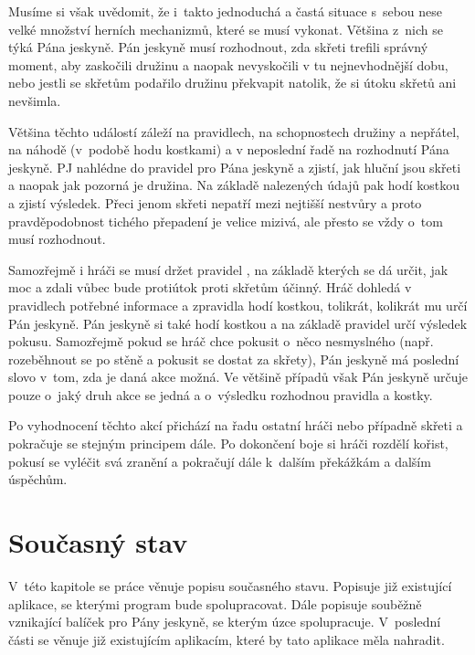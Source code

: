 \documentclass[thesis=B,czech]{resources/FITthesis}[2012/06/26]
\begin{document}
Musíme si však uvědomit, že i~takto jednoduchá a častá situace s~sebou nese velké množství herních mechanizmů, které se musí vykonat. Většina z~nich se týká Pána jeskyně. Pán jeskyně musí rozhodnout, zda skřeti trefili správný moment, aby zaskočili družinu a naopak nevyskočili v tu nejnevhodnější dobu, nebo jestli se skřetům podařilo družinu překvapit natolik, že si útoku skřetů ani nevšimla. \par

Většina těchto událostí záleží na pravidlech, na schopnostech družiny a nepřátel, na náhodě (v~podobě hodu kostkami) a v neposlední řadě na rozhodnutí Pána jeskyně. PJ nahlédne do pravidel pro Pána jeskyně\cite{draci_doupe_PJ} a zjistí, jak hluční jsou skřeti a naopak jak pozorná je družina. Na základě nalezených údajů pak hodí kostkou a zjistí výsledek. Přeci jenom skřeti nepatří mezi nejtišší nestvůry a proto pravděpodobnost tichého přepadení je velice mizivá, ale přesto se vždy o~tom musí rozhodnout. \par

Samozřejmě i hráči se musí držet pravidel \cite{draci_doupe}, na základě kterých se dá určit, jak moc a zdali vůbec bude protiútok proti skřetům účinný. Hráč dohledá v pravidlech potřebné informace a zpravidla hodí kostkou, tolikrát, kolikrát mu určí Pán jeskyně. Pán jeskyně si také hodí kostkou a na základě pravidel určí výsledek pokusu. Samozřejmě pokud se hráč chce pokusit o~něco nesmyslného (např. rozeběhnout se po stěně a pokusit se dostat za skřety), Pán jeskyně má poslední slovo v~tom, zda je daná akce možná. Ve většině případů však Pán jeskyně určuje pouze o~jaký druh akce se jedná a o~výsledku rozhodnou pravidla a kostky. \par

Po vyhodnocení těchto akcí přichází na řadu ostatní hráči nebo případně skřeti a pokračuje se stejným principem dále. Po dokončení boje si hráči rozdělí kořist, pokusí se vyléčit svá zranění a pokračují dále k~dalším překážkám a dalším úspěchům.

\chapter{Současný stav}
V~této kapitole se práce věnuje popisu současného stavu. Popisuje již existující aplikace, se kterými program bude spolupracovat. Dále popisuje souběžně vznikající balíček pro Pány jeskyně, se kterým úzce spolupracuje. V~poslední části se věnuje již existujícím aplikacím, které by tato aplikace měla nahradit.
\end{document}
